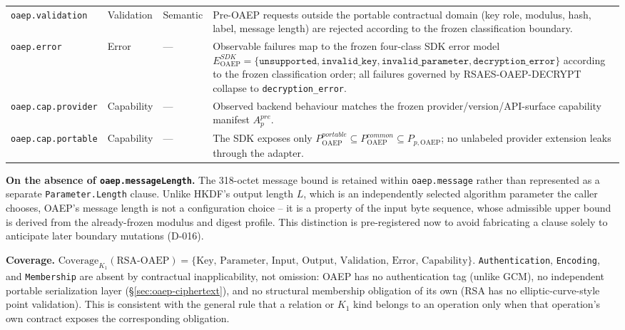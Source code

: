 \documentclass[11pt,a4paper]{article}
\begin{document}
\begin{longtable}{p{}p{}p{}p{}}
\texttt{oaep.validation} &
Validation &
Semantic &
Pre-OAEP requests outside the portable contractual domain (key role, modulus, hash, label, message length) are rejected according to the frozen classification boundary.\\

\texttt{oaep.error} &
Error &
--- &
Observable failures map to the frozen four-class SDK error model
$E_{\mathrm{OAEP}}^{SDK}
=\{\texttt{unsupported},\texttt{invalid\_key},
\texttt{invalid\_parameter},\texttt{decryption\_error}\}$
according to the frozen classification order; all failures governed by RSAES-OAEP-DECRYPT collapse to \texttt{decryption\_error}.\\

\texttt{oaep.cap.provider} &
Capability &
--- &
Observed backend behaviour matches the frozen provider/version/API-surface capability manifest $A_p^{pre}$.\\

\texttt{oaep.cap.portable} &
Capability &
--- &
The SDK exposes only $P_{\mathrm{OAEP}}^{portable}\subseteq
P_{\mathrm{OAEP}}^{common}\subseteq P_{p,\mathrm{OAEP}}$; no unlabeled provider extension leaks through the adapter.\\

\bottomrule
\end{longtable}

\textbf{On the absence of \texttt{oaep.messageLength}.} The 318-octet message bound is retained within \texttt{oaep.message} rather than represented as a separate \texttt{Parameter.Length} clause. Unlike HKDF's output length $L$, which is an independently selected algorithm parameter the caller chooses, OAEP's message length is not a configuration choice -- it is a property of the input byte sequence, whose admissible upper bound is derived from the already-frozen modulus and digest profile. This distinction is pre-registered now to avoid fabricating a clause solely to anticipate later boundary mutations (D-016).

\textbf{Coverage.} $\text{Coverage}_{K_1}(\text{RSA-OAEP}) = \{\text{Key, Parameter, Input, Output, Validation, Error, Capability}\}$. \texttt{Authentication}, \texttt{Encoding}, and \texttt{Membership} are absent by contractual inapplicability, not omission: OAEP has no authentication tag (unlike GCM), no independent portable serialization layer (\S\ref{sec:oaep-ciphertext}), and no structural membership obligation of its own (RSA has no elliptic-curve-style point validation). This is consistent with the general rule that a relation or $K_1$ kind belongs to an operation only when that operation's own contract exposes the corresponding obligation.
\end{document}
